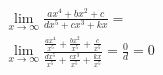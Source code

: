 \begin{ex}
\begin{align}
&\lim_{x\rightarrow \infty} \frac{ax^4+bx^2+c}{dx^5+cx^3+kx}=\nonumber\\
&\lim_{x\rightarrow \infty} \frac{\frac{ax^4}{x^5}+\frac{bx^2}{x^5}+\frac{c}{x^5}}{\frac{dx^5}{x^5}+\frac{cx^3}{x^5}+\frac{kx}{x^5}}=\frac{0}{d}=0\nonumber
\end{align}
\end{ex}
